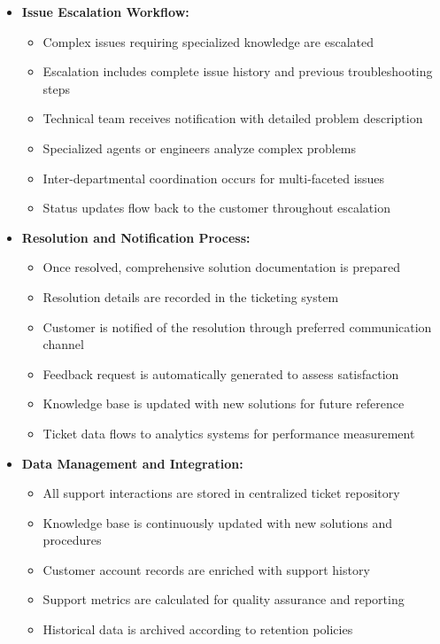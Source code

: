 \begin{itemize}
    \item \textbf{Issue Escalation Workflow:}
    \begin{itemize}
        \item Complex issues requiring specialized knowledge are escalated
        \item Escalation includes complete issue history and previous troubleshooting steps
        \item Technical team receives notification with detailed problem description
        \item Specialized agents or engineers analyze complex problems
        \item Inter-departmental coordination occurs for multi-faceted issues
        \item Status updates flow back to the customer throughout escalation
    \end{itemize}

    \item \textbf{Resolution and Notification Process:}
    \begin{itemize}
        \item Once resolved, comprehensive solution documentation is prepared
        \item Resolution details are recorded in the ticketing system
        \item Customer is notified of the resolution through preferred communication channel
        \item Feedback request is automatically generated to assess satisfaction
        \item Knowledge base is updated with new solutions for future reference
        \item Ticket data flows to analytics systems for performance measurement
    \end{itemize}

    \item \textbf{Data Management and Integration:}
    \begin{itemize}
        \item All support interactions are stored in centralized ticket repository
        \item Knowledge base is continuously updated with new solutions and procedures
        \item Customer account records are enriched with support history
        \item Support metrics are calculated for quality assurance and reporting
        \item Historical data is archived according to retention policies
    \end{itemize}
\end{itemize}

